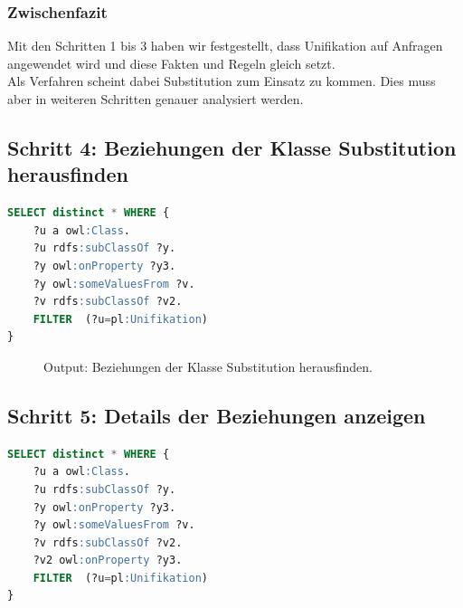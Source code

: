 \subsubsection{Zwischenfazit}
\label{sssec:anh_beispiel_c_3_1}

Mit den Schritten 1 bis 3 haben wir festgestellt, dass Unifikation auf Anfragen angewendet wird und diese Fakten und Regeln gleich setzt.\\
Als Verfahren scheint dabei Substitution zum Einsatz zu kommen. Dies muss aber in weiteren Schritten genauer analysiert werden.

\subsection{Schritt 4: Beziehungen der Klasse Substitution herausfinden}
\label{ssec:anh_beispiel_c_4}

\begin{lstlisting}[caption={ Beziehungen der Klasse Substitution herausfinden},captionpos=b,language=SQL]
SELECT distinct * WHERE { 
	?u a owl:Class.
	?u rdfs:subClassOf ?y.
	?y owl:onProperty ?y3.	
	?y owl:someValuesFrom ?v.
	?v rdfs:subClassOf ?v2.
	FILTER  (?u=pl:Unifikation)
}

\end{lstlisting}

\begin{figure}[H]
\centering {}
\caption{Output: Beziehungen der Klasse Substitution herausfinden.\label{fig:prolog_4}\protect\footnotemark}
\end{figure}

\subsection{Schritt 5: Details der Beziehungen anzeigen}
\label{ssec:anh_beispiel_c_5}

\begin{lstlisting}[caption={ Details der Beziehungen anzeigen},captionpos=b,language=SQL]
SELECT distinct * WHERE { 
	?u a owl:Class.
	?u rdfs:subClassOf ?y.
	?y owl:onProperty ?y3.	
	?y owl:someValuesFrom ?v.
	?v rdfs:subClassOf ?v2.
	?v2 owl:onProperty ?y3.	
	FILTER  (?u=pl:Unifikation)
}


\end{lstlisting}

